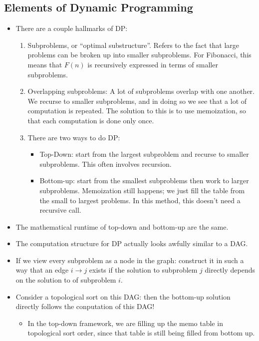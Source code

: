 \documentclass[10pt]{article}
\begin{document}
	\subsection{Elements of Dynamic Programming}
	\begin{itemize}
		\item There are a couple hallmarks of DP:
			\begin{enumerate}
				\item Subproblems, or ``optimal substructure''. Refers to the fact that large problems 
					can be broken up into smaller subproblems. For Fibonacci, this means that 
					$F(n)$ is recursively expressed in terms of smaller subproblems.
				\item Overlapping subproblems: A lot of subproblems overlap with one another. We recurse to 
					smaller subproblems, and in doing so we see that a lot of computation 
					is repeated. The solution to this is to use memoization, so that 
					each computation is done only once.
		\item There are two ways to do DP:
			\begin{itemize}
				\item Top-Down: start from the largest subproblem and recurse to smaller subproblems. 
					This often involves recursion.    
				\item Bottom-up: start from the smallest subproblems then work to larger subproblems.
					Memoization still happens; we just fill the table from the small to 
					largest problems. In this method, this doesn't need a recursive call. 
			\end{itemize}
		\end{enumerate}
		\item The mathematical runtime of top-down and bottom-up are the same.
		\item The computation structure for DP actually looks awfully similar to a DAG. 
		\item If we view every subproblem as a node in the graph: construct it in such a way that 
			an edge $i \to j$ exists if the solution to subproblem $j$ directly depends on the solution to of 
			subproblem $i$. 
		\item Consider a topological sort on this DAG: then the bottom-up solution directly follows the 
			conputation of this DAG! 
			\begin{itemize}
				\item In the top-down framework, we are filling up the memo table in topological sort order, 
					since that table is still being filled from bottom up.
			\end{itemize}
	\end{itemize}
\end{document}
